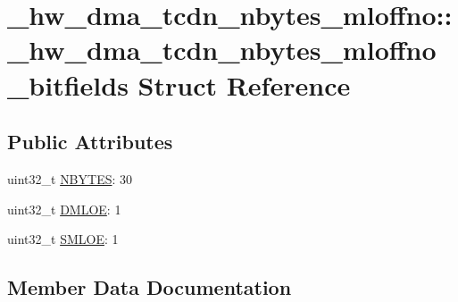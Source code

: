 \hypertarget{struct__hw__dma__tcdn__nbytes__mloffno_1_1__hw__dma__tcdn__nbytes__mloffno__bitfields}{}\section{\+\_\+hw\+\_\+dma\+\_\+tcdn\+\_\+nbytes\+\_\+mloffno\+:\+:\+\_\+hw\+\_\+dma\+\_\+tcdn\+\_\+nbytes\+\_\+mloffno\+\_\+bitfields Struct Reference}
\label{struct__hw__dma__tcdn__nbytes__mloffno_1_1__hw__dma__tcdn__nbytes__mloffno__bitfields}
\subsection*{Public Attributes}
\begin{DoxyCompactItemize}
\item 
uint32\+\_\+t \hyperlink{struct__hw__dma__tcdn__nbytes__mloffno_1_1__hw__dma__tcdn__nbytes__mloffno__bitfields_a49d2062687bc5e3f7b420d8bb3d3b388}{N\+B\+Y\+T\+ES}\+: 30
\item 
uint32\+\_\+t \hyperlink{struct__hw__dma__tcdn__nbytes__mloffno_1_1__hw__dma__tcdn__nbytes__mloffno__bitfields_a0bbb5bc763cc0a64961f8ee5de6b1cc4}{D\+M\+L\+OE}\+: 1
\item 
uint32\+\_\+t \hyperlink{struct__hw__dma__tcdn__nbytes__mloffno_1_1__hw__dma__tcdn__nbytes__mloffno__bitfields_acc780c9d7d8137dff477592b8c03a15d}{S\+M\+L\+OE}\+: 1
\end{DoxyCompactItemize}


\subsection{Member Data Documentation}
